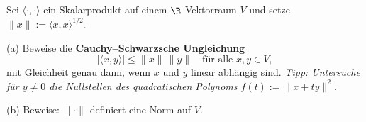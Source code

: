 \begin{prob}
Sei $\langle\cdot ,\cdot \rangle$ ein Skalarprodukt auf einem $\R$-Vektorraum
$V$ und setze $\|x\|:=\langle x,x\rangle^{1/2}$. 

(a) Beweise die {\bf Cauchy--Schwarzsche Ungleichung}
$$
   |\langle x,y\rangle|\leq\|x\|\,\|y\|\quad \text{f\"ur alle } x,y\in V,
$$
mit Gleichheit genau dann, wenn $x$ und $y$ linear abh\"angig sind.
{\em Tipp: Untersuche f\"ur $y\neq 0$ die Nullstellen des
  quadratischen Polynoms $f(t):=\|x+ty\|^2$.}

(b) Beweise: $\|\cdot \|$ definiert eine Norm auf $V$. 
\end{prob}
